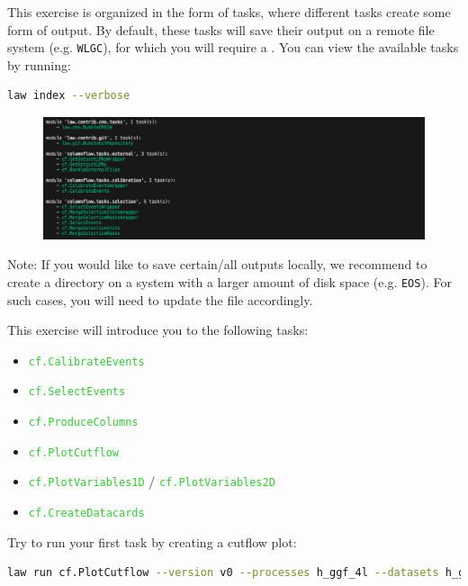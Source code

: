 This exercise is organized in the form of  tasks, where different tasks create some form of output. By default, these tasks will save their output on a remote file system (e.g. \texttt{WLGC}), for which you will require a . You can view the available tasks by running:
\begin{lstlisting}[language=bash]
law index --verbose
\end{lstlisting}

\begin{figure}[!h]
    \centering
    \includegraphics[scale=0.45]{images/law_index.png}
\end{figure}

\begin{tcolorbox}[colback=green!5!white,colframe=green!75!black,width=\textwidth]
Note: If you would like to save certain/all outputs locally, we recommend to create a directory on a system with a larger amount of disk space (e.g. \texttt{EOS}). For such cases, you will need to update the  file accordingly. 
\end{tcolorbox}
\vspace{10pt}
This exercise will introduce you to the following tasks:

\begin{itemize}
    \item \texttt{\textcolor{LimeGreen}{cf.CalibrateEvents}} 
    \item \texttt{\textcolor{LimeGreen}{cf.SelectEvents}}
    \item \texttt{\textcolor{LimeGreen}{cf.ProduceColumns}}
    \item \texttt{\textcolor{LimeGreen}{cf.PlotCutflow}}
    \item \texttt{\textcolor{LimeGreen}{cf.PlotVariables1D}} / \texttt{\textcolor{LimeGreen}{cf.PlotVariables2D}}
    \item \texttt{\textcolor{LimeGreen}{cf.CreateDatacards}}
\end{itemize}

Try to run your first task by creating a cutflow plot:
\begin{lstlisting}[language=bash]
law run cf.PlotCutflow --version v0 --processes h_ggf_4l --datasets h_ggf_4l_powheg --selector-steps trigger,four_leptons --shape-norm
\end{lstlisting}

